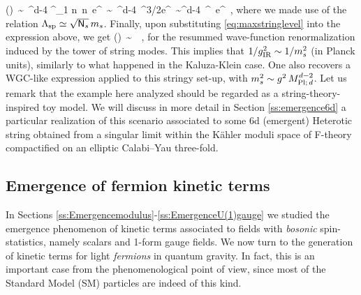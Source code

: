 %
\beq
	\delta \left(\right)\, \sim\, \LSP^{d-4}  \int^{\Ns}_1 n\, n\, e^{}\, \sim\, \LSP^{d-4}\, \Ns^{3/2}e^{\sqrt{\Ns}}\, \sim \Ms^{d-4}\, \Ns^{}\, e^{\sqrt{\Ns}}\, ,
\eeq
%
where we made use of the relation $\Lambda_{\text{sp}} \simeq \sqrt{\mathsf{N}_s}\, m_s$. Finally, upon substituting \eqref{eq:maxstringlevel} into the expression above, we get
%
\beq\label{eq:1-formemergencestringytowersgeneral}
	\delta \left(\right)\, \sim\, \, ,
\eeq 
%
for the resummed wave-function renormalization induced by the tower of string modes. This implies that $1/g_{\text{IR}}^2 \sim 1/m_s^2$ (in Planck units), similarly to what happened in the Kaluza-Klein case. One also recovers a WGC-like expression applied to this stringy set-up, with $m_s^2 \sim g^2\, M_{\text{Pl;}\, d}^{d-2}$. Let us remark that the example here analyzed should be regarded as a string-theory-inspired toy model. We will discuss in more detail in Section \ref{ss:emergence6d} a particular realization of this scenario associated to some 6d (emergent) Heterotic string obtained from a singular limit within the K\"ahler moduli space of F-theory compactified on an elliptic Calabi--Yau three-fold. %
	
\subsection{Emergence of fermion kinetic terms}
\label{ss:kineticfermions}
	
In Sections \ref{ss:Emergencemodulus}-\ref{ss:EmergenceU(1)gauge} we studied the emergence phenomenon of kinetic terms associated to fields with \emph{bosonic} spin-statistics, namely scalars and 1-form gauge fields. We now turn to the generation of kinetic terms for light \emph{fermions} in quantum gravity. In fact, this is an important case from the phenomenological point of view, since most of the Standard Model (SM) particles are indeed of this kind.
	
